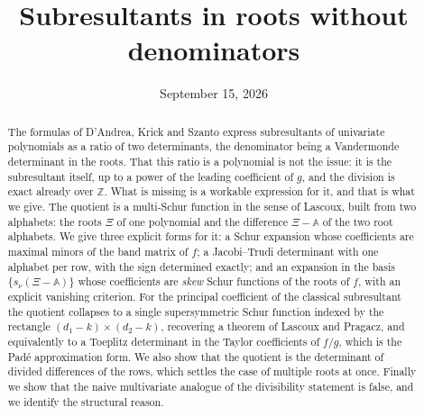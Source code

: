 \documentclass[11pt,reqno]{amsart}
\title[Subresultants in roots without denominators]
      {Subresultants in roots without denominators}
\author{}
\date{September 15, 2026}
\theoremstyle{plain}
\theoremstyle{definition}
\newcommand{\bA}{\mathbb{A}}
\newcommand{\bX}{\Xi}
\newcommand{\ZZ}{\mathbb{Z}}
\begin{document}
\begin{abstract}
The formulas of D'Andrea, Krick and Szanto express subresultants of univariate
polynomials as a ratio of two determinants, the denominator being a Vandermonde
determinant in the roots. That this ratio is a polynomial is not the issue: it is
the subresultant itself, up to a power of the leading coefficient of $g$, and the
division is exact already over $\ZZ$. What is missing is a workable expression for
it, and that is what we give.
The quotient is a multi-Schur function in the sense of Lascoux, built from two
alphabets: the roots $\bX$ of one polynomial and the difference $\bX-\bA$ of the
two root alphabets. We give three explicit forms for it: a Schur expansion whose
coefficients are maximal minors of the band matrix of $f$; a Jacobi--Trudi
determinant with one alphabet per row, with the sign determined exactly; and an
expansion in the basis $\{s_\nu(\bX-\bA)\}$ whose coefficients are \emph{skew}
Schur functions of the roots of $f$, with an explicit vanishing criterion.
For the principal coefficient of the classical subresultant the quotient
collapses to a single supersymmetric Schur function indexed by the rectangle
$(d_1-k)\times(d_2-k)$, recovering a theorem of Lascoux and Pragacz, and
equivalently to a Toeplitz determinant in the Taylor coefficients of $f/g$,
which is the Pad\'e approximation form. We also show that the quotient is the
determinant of divided differences of the rows, which settles the case of
multiple roots at once. Finally we show that the naive multivariate analogue of
the divisibility statement is false, and we identify the structural reason.
\end{abstract}

\maketitle

\begin{center}\small
{}
\end{center}
\end{document}
